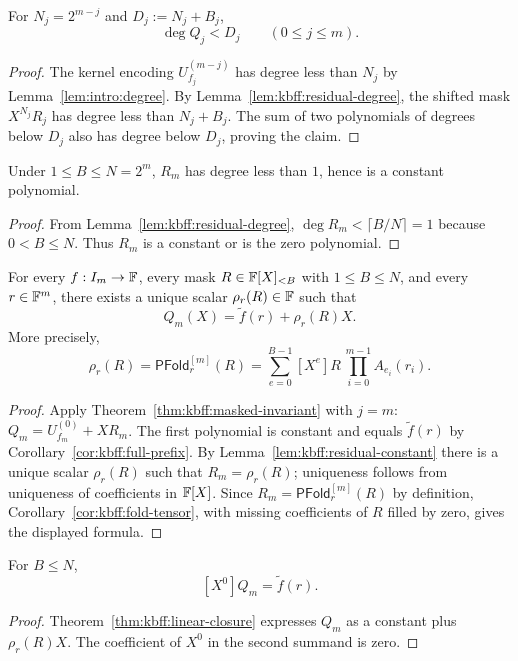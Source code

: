 \begin{corollary}\label{cor:kbff:masked-degree}
For $N_j=2^{m-j}$ and $D_j:=N_j+B_j$,
\[
 \deg Q_j<D_j
 \qquad(0\leq j\leq m).
\]
\end{corollary}
\begin{proof}
The kernel encoding $U_{f_j}^{(m-j)}$ has degree less than $N_j$ by Lemma~\ref{lem:intro:degree}. By Lemma~\ref{lem:kbff:residual-degree}, the shifted mask $X^{N_j}R_j$ has degree less than $N_j+B_j$. The sum of two polynomials of degrees below $D_j$ also has degree below $D_j$, proving the claim.
\end{proof}

\begin{lemma}\label{lem:kbff:residual-constant}
Under $1\leq B\leq N=2^m$, $R_m$ has degree less than $1$, hence is a constant polynomial.
\end{lemma}
\begin{proof}
From Lemma~\ref{lem:kbff:residual-degree},
$\deg R_m<\lceil B/N\rceil=1$ because $0<B\leq N$. Thus $R_m$ is a constant or is the zero polynomial.
\end{proof}

\begin{theorem}\label{thm:kbff:linear-closure}
For every $f:I_m\to\mathbb{F}$, every mask $R\in\mathbb{F}[X]_{<B}$ with $1\leq B\leq N$, and every $r\in\mathbb{F}^m$, there exists a unique scalar
$\rho_r(R)\in\mathbb{F}$ such that
\[
 \boxed{
 Q_m(X)=\widetilde f(r)+\rho_r(R)X.
 }
\]
More precisely,
\[
 \rho_r(R)
  =\mathsf{PFold}^{[m]}_r(R)
  =\sum_{e=0}^{B-1}[X^e]R\,
       \prod_{i=0}^{m-1}A_{e_i}(r_i).
\]
\end{theorem}
\begin{proof}
Apply Theorem~\ref{thm:kbff:masked-invariant} with $j=m$:
$Q_m=U_{f_m}^{(0)}+XR_m$.
The first polynomial is constant and equals $\widetilde f(r)$ by Corollary~\ref{cor:kbff:full-prefix}. By Lemma~\ref{lem:kbff:residual-constant} there is a unique scalar $\rho_r(R)$ such that $R_m=\rho_r(R)$; uniqueness follows from uniqueness of coefficients in $\mathbb{F}[X]$. Since $R_m=\mathsf{PFold}^{[m]}_r(R)$ by definition, Corollary~\ref{cor:kbff:fold-tensor}, with missing coefficients of $R$ filled by zero, gives the displayed formula.
\end{proof}

\begin{corollary}\label{cor:kbff:masked-constant}
For $B\leq N$,
\[
 \boxed{[X^0]Q_m=\widetilde f(r).}
\]
\end{corollary}
\begin{proof}
Theorem~\ref{thm:kbff:linear-closure} expresses $Q_m$ as a constant plus $\rho_r(R)X$. The coefficient of $X^0$ in the second summand is zero.
\end{proof}

